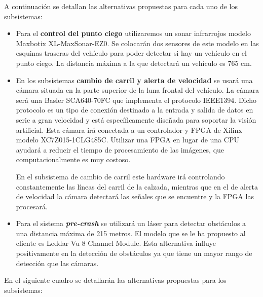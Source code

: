 \par A continuación se detallan las alternativas propuestas para cada uno de los subsistemas:
\begin{itemize}[-]
    \item Para el \textbf{control del punto ciego} utilizaremos un sonar infrarrojos modelo Maxbotix XL-MaxSonar-EZ0. Se colocarán dos sensores de este modelo en las esquinas traseras del vehículo para poder detectar si hay un vehículo en el punto ciego. La distancia máxima a la que detectará un vehículo es 765 cm.
    \item En los subsistemas \textbf{cambio de carril y alerta de velocidad} se usará una cámara situada en la parte superior de la luna frontal del vehículo. La cámara será una Basler SCA640-70FC que implementa el protocolo IEEE1394. Dicho protocolo es un tipo de conexión destinado a la entrada y salida de datos en serie a gran velocidad y está específicamente diseñada para soportar la visión artificial.
    Esta cámara irá conectada a un controlador y FPGA de Xilinx modelo XC7Z015-1CLG485C. Utilizar una FPGA en lugar de una CPU ayudará a reducir el tiempo de procesamiento de las imágenes, que computacionalmente es muy costoso.

    En el subsistema de cambio de carril este hardware irá controlando constantemente las líneas del carril de la calzada, mientras que en el de alerta de velocidad la cámara detectará las señales que se encuentre y la FPGA las procesará.
    \item Para el sistema \textbf{\textit{pre-crash}}  se utilizará un láser para detectar obstáculos a una distancia máxima de 215 metros. El modelo que se le ha propuesto al cliente es Leddar Vu 8 Channel Module. Esta alternativa influye positivamente en la detección de obstáculos ya que tiene un mayor rango de detección que las cámaras.

\end{itemize}
\par En el siguiente cuadro se detallarán las alternativas propuestas para los subsistemas:

